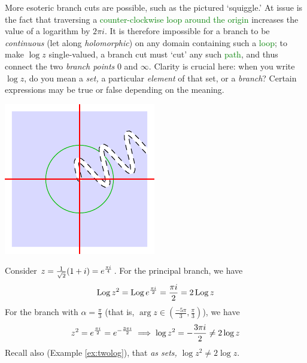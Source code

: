 \goodbreak

\begin{minipage}[t]{0.72\linewidth}\vspace{0pt}
	More esoteric branch cuts are possible, such as the pictured `squiggle.' At issue is the fact that traversing a \textcolor{Green}{counter-clockwise loop around the origin} increases the value of a logarithm  by $2\pi i$. It is therefore impossible for a branch to be \emph{continuous} (let along \emph{holomorphic}) on any domain containing such a \textcolor{Green}{loop}; to make $\log z$ single-valued, a branch cut must `cut' any such \textcolor{Green}{path}, and thus connect the two \emph{branch points} 0 and $\infty$.\smallbreak
	Clarity is crucial here: when you write $\log z$, do you mean a \emph{set,} a particular \emph{element} of that set, or a \emph{branch}? Certain expressions may be true or false depending on the meaning.
\end{minipage}
\hfill
\begin{minipage}[t]{0.27\linewidth}\vspace{0pt}
	\flushright\includegraphics{branch3}
\end{minipage}



\begin{example}{}{}
	Consider $z=\frac 1{\sqrt 2}(1+i)=e^{\frac{\pi i}{4}}$. For the principal branch, we have
	\[
		\operatorname{Log} z^2=\operatorname{Log} e^{\frac{\pi i}{2}} =\frac{\pi i}2 =2\operatorname{Log} z
	\]
	For the branch with $\alpha=\frac{\pi}3$ (that is, $\arg z\in(\frac{-5\pi}3,\frac{\pi}3)$), we have
	\[
		z^2=e^{\frac{\pi i}{2}}=e^{-\frac{3\pi i}{2}}\implies \log z^2=-\frac{3\pi i}2 \neq 2\log z
	\]
	Recall also (Example \ref{ex:twolog}), that \emph{as sets,} $\log z^2\neq 2\log z$. 
\end{example}

